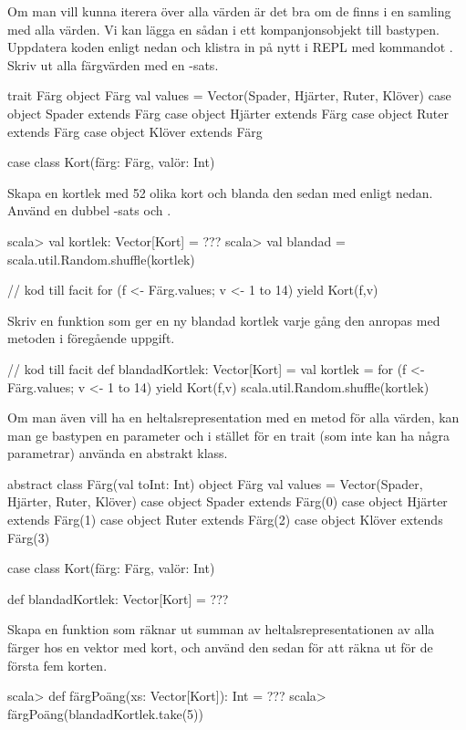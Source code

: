 \Subtask Om man vill kunna iterera över alla värden är det bra om de finns i en samling med alla värden. Vi kan lägga en sådan i ett kompanjonsobjekt till bastypen. Uppdatera koden enligt nedan och klistra in på nytt i REPL med kommandot . Skriv ut alla färgvärden med en -sats.

\begin{Code}
trait Färg
object Färg { 
  val values = Vector(Spader, Hjärter, Ruter, Klöver)
}
case object Spader extends Färg
case object Hjärter extends Färg
case object Ruter extends Färg
case object Klöver extends Färg

case class Kort(färg: Färg, valör: Int)
\end{Code}
Skapa en kortlek med 52 olika kort och blanda den sedan med  enligt nedan. Använd en dubbel -sats och .
\begin{REPL}
scala> val kortlek: Vector[Kort] = ???
scala> val blandad = scala.util.Random.shuffle(kortlek)
\end{REPL}

\begin{Code}
// kod till facit
for (f <- Färg.values; v <- 1 to 14) yield Kort(f,v)
\end{Code}

\Subtask Skriv en funktion  som ger en ny blandad kortlek varje gång den anropas med metoden i föregående uppgift.
\begin{Code}
// kod till facit
def blandadKortlek: Vector[Kort] = {
  val kortlek = 
    for (f <- Färg.values; v <- 1 to 14) yield Kort(f,v)
  scala.util.Random.shuffle(kortlek)
}
\end{Code}



\Subtask Om man även vill ha en heltalsrepresentation med en metod  för alla värden, kan man ge bastypen en parameter och i stället för en trait (som inte kan ha några parametrar) använda en abstrakt klass.

\begin{Code}
abstract class Färg(val toInt: Int)
object Färg { 
  val values = Vector(Spader, Hjärter, Ruter, Klöver)
}
case object Spader extends Färg(0)
case object Hjärter extends Färg(1)
case object Ruter extends Färg(2)
case object Klöver extends Färg(3)

case class Kort(färg: Färg, valör: Int)

def blandadKortlek: Vector[Kort] = ???
\end{Code}
Skapa en funktion  som räknar ut summan av heltalsrepresentationen av alla färger hos en vektor med kort, och använd den sedan för att räkna ut  för de första fem korten.
\begin{REPL}
scala> def färgPoäng(xs: Vector[Kort]): Int = ???
scala> färgPoäng(blandadKortlek.take(5))
\end{REPL}


